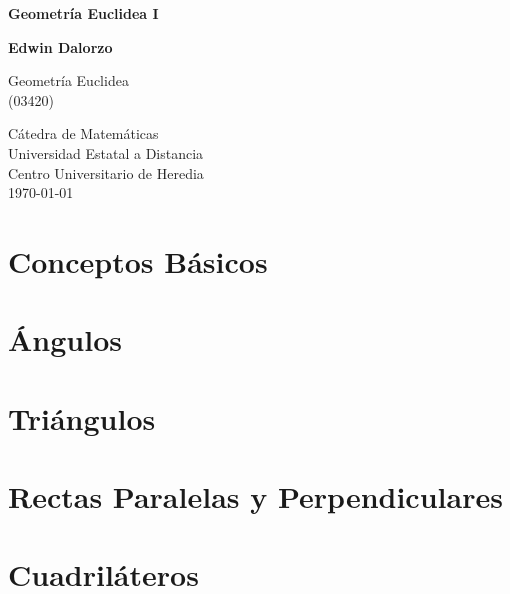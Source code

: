 \documentclass[12pt,titlepage]{article}
\theoremstyle{plain}
\theoremstyle{definition}
\theoremstyle{remark}
\begin{document}
\begin{titlepage}
   \begin{center}
       \vspace*{1cm}

       \Large \textbf{Geometría Euclidea I}

       \vspace{1.5cm}

       \textbf{Edwin Dalorzo}

       \vfill
            
       Geometría Euclidea \\
       (03420)
                   
       \vspace{0.8cm}
            
       Cátedra de Matemáticas \\ Universidad Estatal a Distancia \\ Centro Universitario de Heredia \\ \today \end{center}
\end{titlepage}

\clearpage
\tableofcontents
\clearpage

\section{Conceptos Básicos}


\clearpage

\section{Ángulos}


\clearpage

\section{Triángulos}


\clearpage

\section{Rectas Paralelas y Perpendiculares}


\clearpage

\section{Cuadriláteros}

\end{document}
